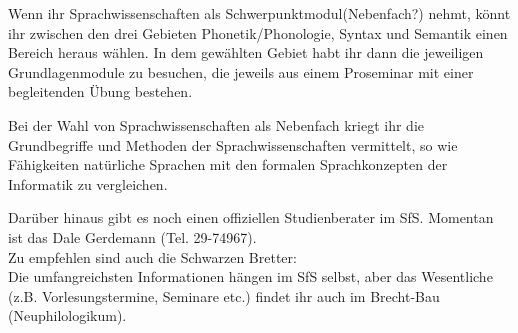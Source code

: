 
Wenn ihr Sprachwissenschaften als Schwerpunktmodul(Nebenfach?) nehmt, könnt ihr zwischen den drei Gebieten Phonetik/Phonologie, Syntax und Semantik einen Bereich heraus wählen.
In dem gewählten Gebiet habt ihr dann die jeweiligen Grundlagenmodule zu besuchen, die jeweils aus einem Proseminar mit einer begleitenden Übung bestehen. 

Bei der Wahl von Sprachwissenschaften als Nebenfach kriegt ihr die Grundbegriffe und Methoden der Sprachwissenschaften vermittelt, so wie Fähigkeiten natürliche Sprachen mit den formalen Sprachkonzepten der Informatik zu vergleichen.

Darüber hinaus gibt es noch einen offiziellen Studienberater im SfS.
  Momentan ist das Dale Gerdemann (Tel. 29-74967).\\
  Zu empfehlen sind auch die Schwarzen Bretter:\\
  Die umfangreichsten Informationen hängen im SfS selbst, aber das
  Wesentliche (z.B. Vorlesungstermine, Seminare etc.) findet ihr auch im Brecht-Bau (Neuphilologikum).
